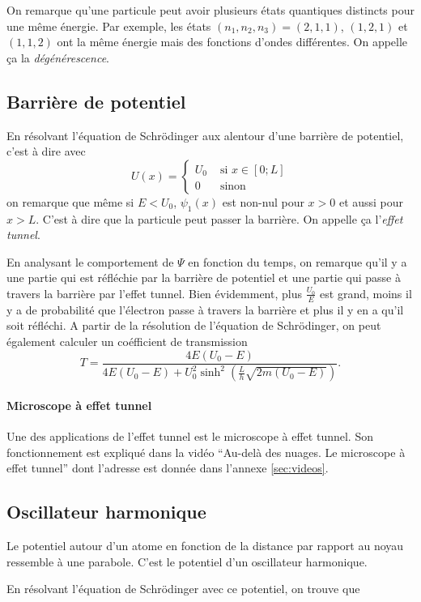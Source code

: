 On remarque qu'une particule peut avoir plusieurs états
quantiques distincts pour une même énergie. Par exemple,
les états $(n_1,n_2,n_3) = (2,1,1)$, $(1,2,1)$ et $(1,1,2)$
ont la même énergie mais des fonctions d'ondes différentes.
On appelle ça la \emph{dégénérescence}.
\subsection{Barrière de potentiel}
En résolvant l'équation de Schrödinger
aux alentour d'une barrière de potentiel,
c'est à dire avec
\[ U(x) = \left\{
  \begin{aligned}
    U_0 & \text{ si } x \in [0; L]\\
    0 & \text{ sinon}
  \end{aligned}
\right. \]
on remarque que même si $E < U_0$,
$\psi_1(x)$ est non-nul pour $x > 0$ et aussi pour $x > L$.
C'est à dire que la particule peut passer la barrière.
On appelle ça l'\emph{effet tunnel}.

En analysant le comportement de $\Psi$ en fonction du temps,
on remarque qu'il y a
une partie qui est réfléchie par la barrière de potentiel et
une partie qui passe à travers la barrière par l'effet tunnel.
Bien évidemment, plus $\frac{U_0}{E}$ est grand,
moins il y a de probabilité que l'électron passe à travers la barrière
et plus il y en a qu'il soit réfléchi.
A partir de la résolution de l'équation de Schrödinger, on
peut également calculer un coéfficient de transmission
\[ T = \frac{4E(U_0-E)}{4E(U_0-E)+U_0^2\sinh^2(\frac{L}{h}\sqrt{2m(U_0-E)})}.\]

\paragraph{Microscope à effet tunnel}
Une des applications de l'effet tunnel est le
microscope à effet tunnel. Son fonctionnement est expliqué dans
la vidéo ``Au-delà des nuages. Le microscope à effet tunnel''
dont l'adresse est donnée dans l'annexe \ref{sec:videos}.

\subsection{Oscillateur harmonique}
Le potentiel autour d'un atome en fonction de la distance
par rapport au noyau ressemble à une parabole.
C'est le potentiel d'un oscillateur harmonique.

En résolvant l'équation de Schrödinger avec ce potentiel,
on trouve que

